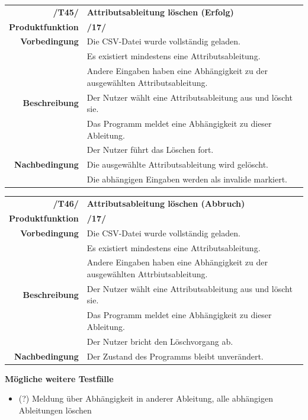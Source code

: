 \documentclass{article}
\begin{document}
\begin{table}[H]
\begin{tabularx}{\textwidth}{rX}
 \vspace{1mm}
\textbf{/T45/}         & \textbf{Attributsableitung löschen (Erfolg)} \\ \vspace{1mm}
\textbf{Produktfunktion} & \textbf{/17/} \\
\textbf{Vorbedingung}  & Die CSV-Datei wurde vollständig geladen. \\ & Es existiert mindestens eine Attributsableitung.  \\ \vspace{1mm} & Andere Eingaben haben eine Abhängigkeit zu der ausgewählten Attributsableitung. \\
\textbf{Beschreibung}  & Der Nutzer wählt eine Attributsableitung aus und löscht sie. \\ & Das Programm meldet eine Abhängigkeit zu dieser Ableitung. \\ \vspace{1mm} & Der Nutzer führt das Löschen fort. \\
\textbf{Nachbedingung} & Die ausgewählte Attributsableitung wird gelöscht. \\ & Die abhängigen Eingaben werden als invalide markiert.
\end{tabularx}
\end{table}

\begin{table}[H]
\begin{tabularx}{\textwidth}{rX}
 \vspace{1mm}
\textbf{/T46/}         & \textbf{Attributsableitung löschen (Abbruch)} \\ \vspace{1mm}
\textbf{Produktfunktion} & \textbf{/17/} \\
\textbf{Vorbedingung}  & Die CSV-Datei wurde vollständig geladen. \\ & Es existiert mindestens eine Attributsableitung.  \\ \vspace{1mm} & Andere Eingaben haben eine Abhängigkeit zu der ausgewählten Attrbiutsableitung. \\
\textbf{Beschreibung}  & Der Nutzer wählt eine Attributsableitung aus und löscht sie. \\ & Das Programm meldet eine Abhängigkeit zu dieser Ableitung. \\ \vspace{1mm} & Der Nutzer bricht den Löschvorgang ab. \\
\textbf{Nachbedingung} & Der Zustand des Programms bleibt unverändert.
\end{tabularx}
\end{table}
\textbf{Mögliche weitere Testfälle}
\begin{itemize}
    \item (?) Meldung über Abhängigkeit in anderer Ableitung, alle abhängigen Ableitungen löschen
\end{itemize}
\end{document}
